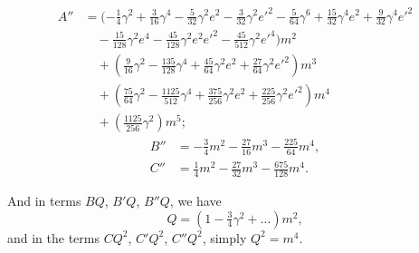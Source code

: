 \documentclass[11pt,a4paper]{article}
\theoremstyle{plain}
\theoremstyle{definition}
\theoremstyle{remark}
\begin{document}
\begin{align*}
A'' &= (-\tfrac14 \gamma^{2} + \tfrac{3}{16}\gamma^{4} - \tfrac{5}{32}\gamma^{2}e^{2} - \tfrac{3}{32}\gamma^{2}e'^{2} - \tfrac{5}{64}\gamma^{6} + \tfrac{15}{32}\gamma^{4}e^{2} + \tfrac{9}{32}\gamma^{4}e'^{2}\\
&\quad - \tfrac{15}{128}\gamma^{2}e^{4} - \tfrac{45}{128}\gamma^{2}e^{2}e'^{2} - \tfrac{45}{512}\gamma^{2}e'^{4})m^{2}\\
&\quad + (\tfrac{9}{16}\gamma^{2} - \tfrac{135}{128}\gamma^{4} + \tfrac{45}{64}\gamma^{2}e^{2} + \tfrac{27}{64}\gamma^{2}e'^{2})m^{3}\\
&\quad + (\tfrac{75}{64}\gamma^{2} - \tfrac{1125}{512}\gamma^{4} + \tfrac{375}{256}\gamma^{2}e^{2} + \tfrac{225}{256}\gamma^{2}e'^{2})m^{4}\\
&\quad + (\tfrac{1125}{256}\gamma^{2})m^{5};
\end{align*}
\begin{align*}
B'' &= -\tfrac34 m^{2} - \tfrac{27}{16}m^{3} - \tfrac{225}{64}m^{4},\\
C'' &= \tfrac14 m^{2} - \tfrac{27}{32}m^{3} - \tfrac{675}{128}m^{4}.
\end{align*}

\newpage

And in terms $BQ$, $B'Q$, $B''Q$, we have
\[
Q=(1-\tfrac34 \gamma^{2}+\dots)m^{2},
\]
and in the terms $CQ^{2}$, $C'Q^{2}$, $C''Q^{2}$, simply $Q^{2}=m^{4}$.
\end{document}
